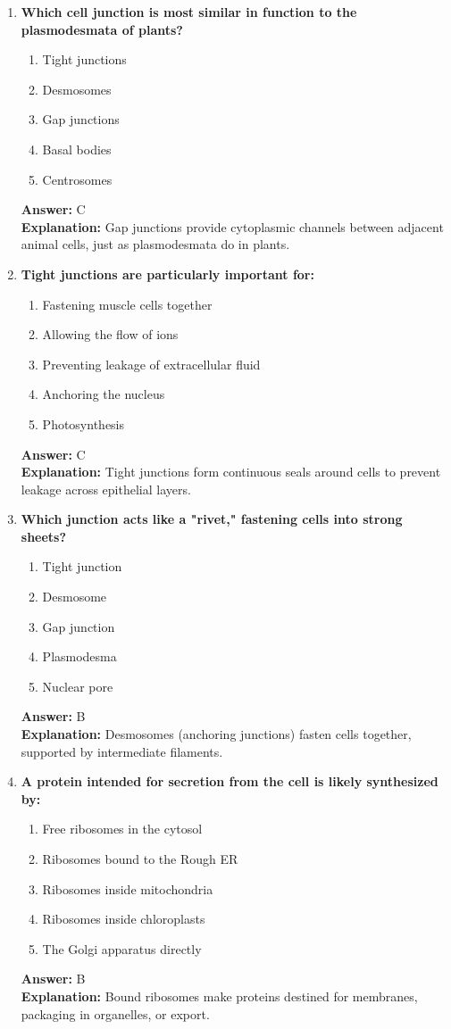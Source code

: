 \documentclass[11pt, a4paper]{article}
\begin{document}
\begin{enumerate}[leftmargin=*, label=\arabic*.]
\item \textbf{Which cell junction is most similar in function to the plasmodesmata of plants?}
\begin{enumerate}[label=\Alph*.]
\item Tight junctions
\item Desmosomes
\item Gap junctions
\item Basal bodies
\item Centrosomes
\end{enumerate}
\textbf{Answer:} C \\
\textbf{Explanation:} Gap junctions provide cytoplasmic channels between adjacent animal cells, just as plasmodesmata do in plants.

\item \textbf{Tight junctions are particularly important for:}
\begin{enumerate}[label=\Alph*.]
\item Fastening muscle cells together
\item Allowing the flow of ions
\item Preventing leakage of extracellular fluid
\item Anchoring the nucleus
\item Photosynthesis
\end{enumerate}
\textbf{Answer:} C \\
\textbf{Explanation:} Tight junctions form continuous seals around cells to prevent leakage across epithelial layers.

\item \textbf{Which junction acts like a "rivet," fastening cells into strong sheets?}
\begin{enumerate}[label=\Alph*.]
\item Tight junction
\item Desmosome
\item Gap junction
\item Plasmodesma
\item Nuclear pore
\end{enumerate}
\textbf{Answer:} B \\
\textbf{Explanation:} Desmosomes (anchoring junctions) fasten cells together, supported by intermediate filaments.

\item \textbf{A protein intended for secretion from the cell is likely synthesized by:}
\begin{enumerate}[label=\Alph*.]
\item Free ribosomes in the cytosol
\item Ribosomes bound to the Rough ER
\item Ribosomes inside mitochondria
\item Ribosomes inside chloroplasts
\item The Golgi apparatus directly
\end{enumerate}
\textbf{Answer:} B \\
\textbf{Explanation:} Bound ribosomes make proteins destined for membranes, packaging in organelles, or export.


\end{enumerate}
\end{document}
